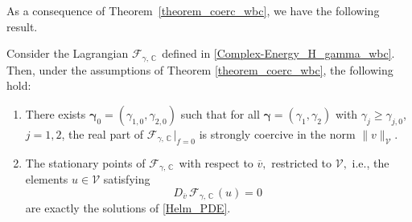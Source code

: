 \documentclass[twoside,11pt]{article}
\def\C{{\mathbb C}}
\def\vbar{\overline{v}}
\def\Vc{{\mathscr V}}
\begin{document}
{As a consequence of Theorem~\ref{theorem_coerc_wbc}, we have the following result.
\begin{theorem}\label{Theorem_SCVP_2}
Consider the Lagrangian  $\mathcal{F}_{\gamma,\,  \C \, } $ defined in \eqref{Complex-Energy_H_gamma_wbc}. %
Then, under the assumptions of Theorem \ref{theorem_coerc_wbc}, the following hold:
\begin{enumerate}
\item[(i)] {There exists $\boldsymbol{\gamma}_0=(\gamma_{1,0},\gamma_{2,0})$ such that for all $\boldsymbol{\gamma}=(\gamma_1,\gamma_2)$ with $\gamma_j\ge \gamma_{j,0}$, $j=1,2$, the  real part of $\mathcal{F}_{\gamma,\,  \C \, } \big|_{f=0}$   is strongly coercive in the norm $\|v\|_{\Vc}$.}
\item[(ii)] The stationary points of $\mathcal{F}_{\gamma,\,  \C \, } $ with respect to $\vbar, $    restricted to $\Vc, $ i.e., the elements   $u\in \Vc$ satisfying 
$$   D _ {\vbar } \, \mathcal{F}_{\gamma,\,  \C \, } ( u ) =0 \, $$
 are {exactly} the solutions of \eqref{Helm_PDE}.
\end{enumerate}
\end{theorem}

}
\end{document}
